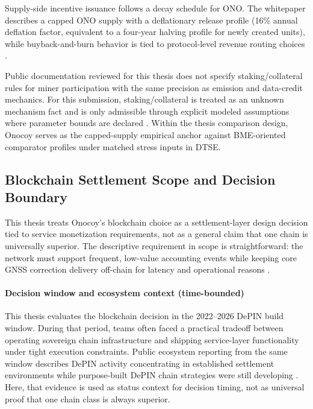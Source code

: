 Supply-side incentive issuance follows a decay schedule for ONO. The whitepaper describes a capped ONO supply with a deflationary release profile (16\% annual deflation factor, equivalent to a four-year halving profile for newly created units), while buyback-and-burn behavior is tied to protocol-level revenue routing choices \cite{OnocoyWhitepaper301, OnocoyToken}.

Public documentation reviewed for this thesis does not specify staking/collateral rules for miner participation with the same precision as emission and data-credit mechanics. For this submission, staking/collateral is treated as an unknown mechanism fact and is only admissible through explicit modeled assumptions where parameter bounds are declared \cite{OnocoyToken, OnocoyRewards}.
Within the thesis comparison design, Onocoy serves as the capped-supply empirical anchor against BME-oriented comparator profiles under matched stress inputs in DTSE.

\subsection{Blockchain Settlement Scope and Decision Boundary}
This thesis treats Onocoy's blockchain choice as a settlement-layer design decision tied to service monetization requirements, not as a general claim that one chain is universally superior. The descriptive requirement in scope is straightforward: the network must support frequent, low-value accounting events while keeping core GNSS correction delivery off-chain for latency and operational reasons \cite{OnocoyWhitepaper301, OnocoyToken}.

\paragraph*{Decision window and ecosystem context (time-bounded)}
This thesis evaluates the blockchain decision in the 2022--2026 DePIN build window. During that period, teams often faced a practical tradeoff between operating sovereign chain infrastructure and shipping service-layer functionality under tight execution constraints. Public ecosystem reporting from the same window describes DePIN activity concentrating in established settlement environments while purpose-built DePIN chain strategies were still developing \cite{Messari2024, FrontiersDePIN2025}. Here, that evidence is used as status context for decision timing, not as universal proof that one chain class is always superior.


